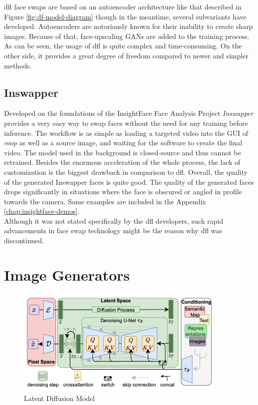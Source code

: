 \documentclass[
  a4paper,  %
  twoside,  %
  bibliography=totoc,
  headsepline,
  cleardoublepage=empty,
  parskip=half,
  draft=false
]{scrbook}
\begin{document}
\gls{dfl} face swaps are based on an autoencoder architecture like that described in Figure \ref{fig:df-model-diagram} though in the meantime, several subvariants have developed. Autoencoders are notoriously known for their inability to create sharp images. Because of that, face-upscaling GANs are added to the training process. \\
As can be seen, the usage of \gls{dfl} is quite complex and time-consuming. On the other side, it provides a great degree of freedom compared to newer and simpler methods.

\subsection{Inswapper}
\label{sec:roop}
Developed on the foundations of the InsightFace Face Analysis Project \cite{insightfaceInsightFaceWebsite} \textit{Inswapper} provides a very easy way to swap faces without the need for any training before inference. The workflow is as simple as loading a targeted video into the GUI of \textit{roop} \cite{sangwanRoop2023} as well as a source image, and waiting for the software to create the final video. The model used in the background is closed-source and thus cannot be retrained. Besides the enormous acceleration of the whole process, the lack of customization is the biggest drawback in comparison to \gls{dfl}. Overall, the quality of the generated Inswapper faces is quite good. The quality of the generated faces drops significantly in situations where the face is obscured or angled in profile towards the camera. Some examples are included in the Appendix \ref{chap:insightface-demos}. \\
Although it was not stated specifically by the \gls{dfl} developers, such rapid advancements in face swap technology might be the reason why \gls{dfl} was discontinued.

\section{Image Generators}
\label{sec:stable-diffusion-bg}
\begin{figure}[h]
  \centering
  \includegraphics[width=0.9\textwidth]{./graphics/latent-diffusion.png}
  \caption{Latent Diffusion Model \cite{rombachHighResolutionImageSynthesis2022}}
  \label{fig:ldm-arch}
\end{figure}
\end{document}
